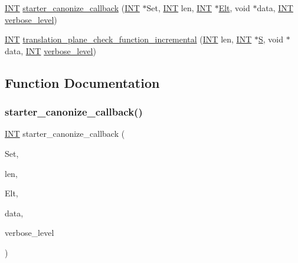 \begin{DoxyCompactItemize}
\item 
\mbox{\hyperlink{galois_8h_a09fddde158a3a20bd2dcadb609de11dc}{I\+NT}} \mbox{\hyperlink{translation__plane_8_c_a9f4fb3345cafd1d4c820252f8f4e8a86}{starter\+\_\+canonize\+\_\+callback}} (\mbox{\hyperlink{galois_8h_a09fddde158a3a20bd2dcadb609de11dc}{I\+NT}} $\ast$Set, \mbox{\hyperlink{galois_8h_a09fddde158a3a20bd2dcadb609de11dc}{I\+NT}} len, \mbox{\hyperlink{galois_8h_a09fddde158a3a20bd2dcadb609de11dc}{I\+NT}} $\ast$\mbox{\hyperlink{simeon_8_c_aec1406935bdb1fee3561fcb840964100}{Elt}}, void $\ast$data, \mbox{\hyperlink{galois_8h_a09fddde158a3a20bd2dcadb609de11dc}{I\+NT}} \mbox{\hyperlink{simeon_8_c_a818073fbcc2f439e7c56952f67386122}{verbose\+\_\+level}})
\item 
\mbox{\hyperlink{galois_8h_a09fddde158a3a20bd2dcadb609de11dc}{I\+NT}} \mbox{\hyperlink{translation__plane_8_c_a5692db738216f93dd67071f96dc7b2bd}{translation\+\_\+plane\+\_\+check\+\_\+function\+\_\+incremental}} (\mbox{\hyperlink{galois_8h_a09fddde158a3a20bd2dcadb609de11dc}{I\+NT}} len, \mbox{\hyperlink{galois_8h_a09fddde158a3a20bd2dcadb609de11dc}{I\+NT}} $\ast$\mbox{\hyperlink{simeon_8_c_adab47f8243f1b5a2c31df2535d6b37d0}{S}}, void $\ast$data, \mbox{\hyperlink{galois_8h_a09fddde158a3a20bd2dcadb609de11dc}{I\+NT}} \mbox{\hyperlink{simeon_8_c_a818073fbcc2f439e7c56952f67386122}{verbose\+\_\+level}})
\end{DoxyCompactItemize}


\subsection{Function Documentation}
\mbox{\label{translation__plane_8_c_a9f4fb3345cafd1d4c820252f8f4e8a86}} 
\subsubsection{\texorpdfstring{starter\+\_\+canonize\+\_\+callback()}{starter\_canonize\_callback()}}
{\footnotesize\ttfamily \mbox{\hyperlink{galois_8h_a09fddde158a3a20bd2dcadb609de11dc}{I\+NT}} starter\+\_\+canonize\+\_\+callback (\begin{DoxyParamCaption}\item[{\mbox{\hyperlink{galois_8h_a09fddde158a3a20bd2dcadb609de11dc}{I\+NT}} $\ast$}]{Set,  }\item[{\mbox{\hyperlink{galois_8h_a09fddde158a3a20bd2dcadb609de11dc}{I\+NT}}}]{len,  }\item[{\mbox{\hyperlink{galois_8h_a09fddde158a3a20bd2dcadb609de11dc}{I\+NT}} $\ast$}]{Elt,  }\item[{void $\ast$}]{data,  }\item[{\mbox{\hyperlink{galois_8h_a09fddde158a3a20bd2dcadb609de11dc}{I\+NT}}}]{verbose\+\_\+level }\end{DoxyParamCaption})}

